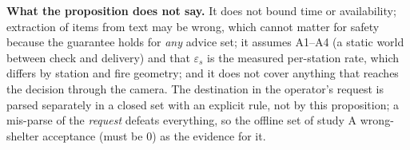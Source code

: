 \documentclass[conference]{IEEEtran}
\begin{document}
\textbf{What the proposition does not say.} It does not bound time or availability; extraction of items from text may be wrong, which cannot matter for safety because the guarantee holds for \emph{any} advice set; it assumes A1--A4 (a static world between check and delivery) and that $\varepsilon_s$ is the measured per-station rate, which differs by station and fire geometry; and it does not cover anything that reaches the decision through the camera. The destination in the operator's request is parsed separately in a closed set with an explicit rule, not by this proposition; a mis-parse of the \emph{request} defeats everything, so the offline set of study A  wrong-shelter acceptance (must be 0) as the evidence for it.
\end{document}
